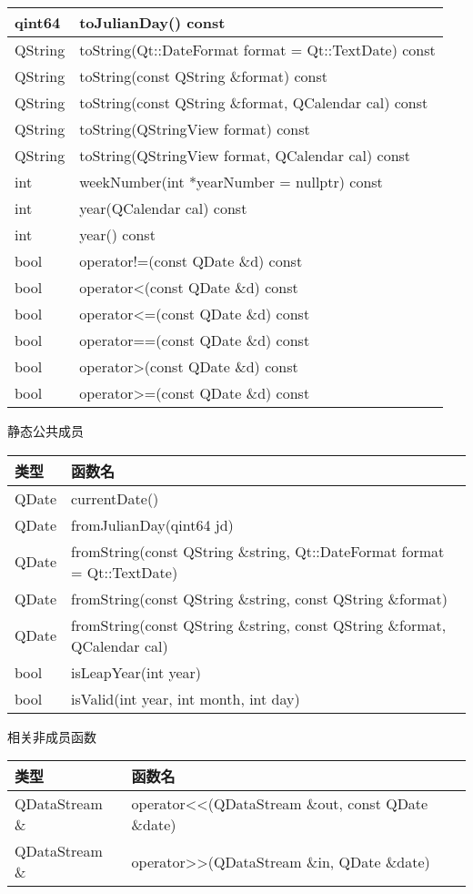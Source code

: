 \begin{longtable}{|l|l|}
\hline
qint64&	toJulianDay() const\\
\hline
QString&	toString(Qt::DateFormat format = Qt::TextDate) const\\
\hline
QString&	toString(const QString \&format) const\\
\hline
QString&	toString(const QString \&format, QCalendar cal) const\\
\hline
QString&	toString(QStringView format) const\\
\hline
QString&	toString(QStringView format, QCalendar cal) const\\
\hline
int&	weekNumber(int *yearNumber = nullptr) const\\
\hline
int&	year(QCalendar cal) const\\
\hline
int&	year() const\\
\hline
bool&	operator!=(const QDate \&d) const\\
\hline
bool&	operator<(const QDate \&d) const\\
\hline
bool&	operator<=(const QDate \&d) const\\
\hline
bool&	operator==(const QDate \&d) const\\
\hline
bool&	operator>(const QDate \&d) const\\
\hline
bool&	operator>=(const QDate \&d) const\\
\hline
\end{longtable}

静态公共成员

\begin{tabular}{|l|l|}
\hline
类型&	函数名\\
\hline
QDate&	currentDate()\\
\hline
QDate&	fromJulianDay(qint64 jd)\\
\hline
QDate&	fromString(const QString \&string, Qt::DateFormat format = Qt::TextDate)\\
\hline
QDate&	fromString(const QString \&string, const QString \&format)\\
\hline
QDate&	fromString(const QString \&string, const QString \&format, QCalendar cal)\\
\hline
bool&	isLeapYear(int year)\\
\hline
bool&	isValid(int year, int month, int day)\\
\hline
\end{tabular}

\splitLine

相关非成员函数

\begin{tabular}{|l|l|}
\hline
类型&	函数名\\
\hline
QDataStream \& &	operator<<(QDataStream \&out, const QDate \&date) \\
\hline
QDataStream \&	& operator>>(QDataStream \&in, QDate \&date)\\
\hline
\end{tabular}


